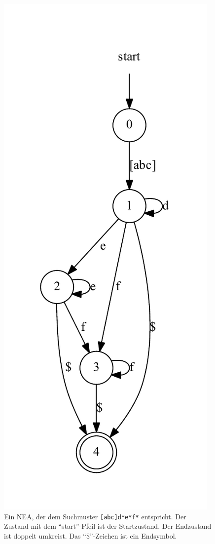 \begin{figure}
\centering
\includegraphics[scale=0.7]{resources/nea.pdf}
\caption{Ein NEA, der dem Suchmuster \texttt{[abc]d*e*f*} entspricht. Der Zustand mit dem "`start"'-Pfeil ist der Startzustand. Der Endzustand ist doppelt umkreist. Das "`\$"'-Zeichen ist ein Endsymbol.}
\label{fig-nea}
\end{figure}

